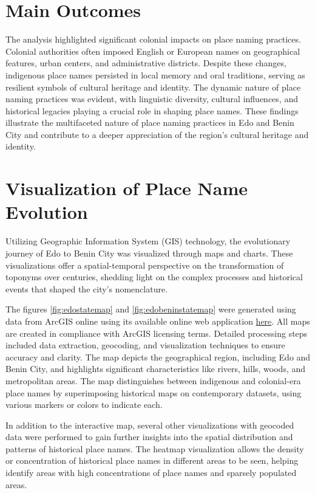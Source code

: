 \section{Main Outcomes}

The analysis highlighted significant colonial impacts on place naming practices. Colonial authorities often imposed English or European names on geographical features, urban centers, and administrative districts. Despite these changes, indigenous place names persisted in local memory and oral traditions, serving as resilient symbols of cultural heritage and identity. The dynamic nature of place naming practices was evident, with linguistic diversity, cultural influences, and historical legacies playing a crucial role in shaping place names. These findings illustrate the multifaceted nature of place naming practices in Edo and Benin City and contribute to a deeper appreciation of the region's cultural heritage and identity.

\section{Visualization of Place Name Evolution}

Utilizing Geographic Information System (GIS) technology, the evolutionary journey of Edo to Benin City was visualized through maps and charts. These visualizations offer a spatial-temporal perspective on the transformation of toponyms over centuries, shedding light on the complex processes and historical events that shaped the city's nomenclature.

The figures \ref{fig:edostatemap} and \ref{fig:edobeninstatemap} were generated using data from ArcGIS online using its available online web application \href{https://www.arcgis.com/apps/mapviewer/index.html}{here}. All maps are created in compliance with ArcGIS licensing terms. Detailed processing steps included data extraction, geocoding, and visualization techniques to ensure accuracy and clarity. The map depicts the geographical region, including Edo and Benin City, and highlights significant characteristics like rivers, hills, woods, and metropolitan areas. The map distinguishes between indigenous and colonial-era place names by superimposing historical maps on contemporary datasets, using various markers or colors to indicate each.

In addition to the interactive map, several other visualizations with geocoded data were performed to gain further insights into the spatial distribution and patterns of historical place names. The heatmap visualization allows the density or concentration of historical place names in different areas to be seen, helping identify areas with high concentrations of place names and sparsely populated areas.

